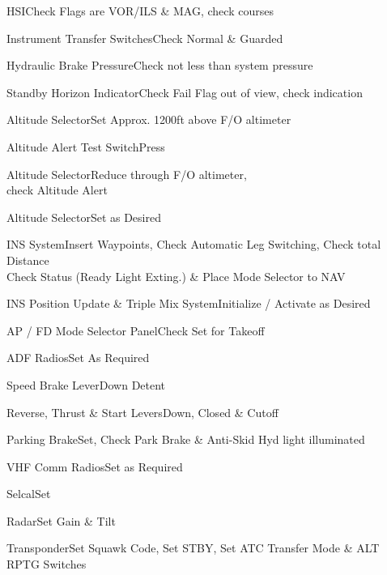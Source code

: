 \documentclass[sim-use, blue_items]{checklist}
\begin{document}
\begin{continuedchecklist}
	\item{HSI}{Check Flags are VOR/ILS \& MAG, check courses}
	\item{Instrument Transfer Switches}{Check Normal \& Guarded}
	\item{Hydraulic Brake Pressure}{Check not less than system pressure}
	\item{Standby Horizon Indicator}{Check Fail Flag out of view, check indication}
	 {
		\item{Altitude Selector}{Set Approx. 1200ft above F/O altimeter}
		\item{Altitude Alert Test Switch}{Press}
		\item{Altitude Selector}{Reduce through F/O altimeter,\\check Altitude Alert}
		\item{Altitude Selector}{Set as Desired}
	}
	\item{INS System}{Insert Waypoints, Check Automatic Leg Switching, Check total Distance\\Check Status (Ready Light Exting.) \& Place Mode Selector to NAV}
	\item{INS Position Update \& Triple Mix System}{Initialize / Activate as Desired}
	\item{AP / FD Mode Selector Panel}{Check Set for Takeoff}
	\item{ADF Radios}{Set As Required}
	\item{Speed Brake Lever}{Down Detent}
	\item{Reverse, Thrust \& Start Levers}{Down, Closed \& Cutoff}
	\item{Parking Brake}{Set, Check Park Brake \& Anti-Skid Hyd light illuminated}
	\item{VHF Comm Radios}{Set as Required}
	\item{Selcal}{Set}
	\item{Radar}{Set Gain \& Tilt}
	\item{Transponder}{Set Squawk Code, Set STBY, Set ATC Transfer Mode \& ALT RPTG Switches}
\end{continuedchecklist}
\end{document}
